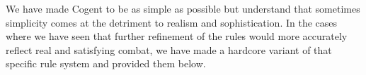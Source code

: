 We have made Cogent to be as simple as possible but understand that sometimes simplicity comes at the detriment to realism and sophistication. In the cases where we have seen that further refinement of the rules would more accurately reflect real and satisfying combat, we have made a hardcore variant of that specific rule system and provided them below.